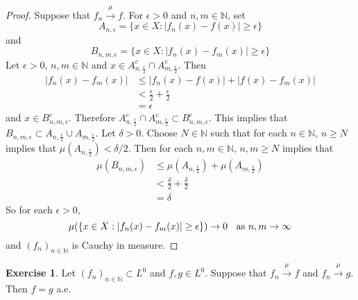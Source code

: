 \documentclass[12pt]{amsart}
\theoremstyle{definition}
\newtheorem{ex}[definition]{Exercise}
\newcommand{\del}{\delta}
\newcommand{\ep}{\epsilon}
\newcommand{\N}{\mathbb{N}}
\newcommand{\conv}[1]{\xrightarrow{#1}}
\begin{document}
	\begin{proof}
	Suppose that $f_n \conv{\mu} f$. For $\ep >0$ and $n,m \in \N$, set 
	$$A_{n, \ep} = \{x \in X: |f_n(x) - f(x)| \geq \ep \}$$ 
	and 
	$$B_{n,m, \ep} = \{x \in X: |f_n(x) - f_m(x)| \geq \ep \}$$
	Let $\ep >0$, $n, m \in \N$ and $x \in A_{n, \frac{\ep}{2}}^c \cap A_{m, \frac{\ep}{2}}^c$. Then 
	\begin{align*}
	|f_n(x) - f_m(x)| 
	& \leq  |f_n(x) - f(x)| + |f(x) - f_m(x)| \\
	& < \frac{\ep}{2} + \frac{\ep}{2} \\
	&= \ep  
	\end{align*}
	and $x \in B_{n,m, \ep}^c$. Therefore $A_{n, \frac{\ep}{2}}^c \cap A_{m, \frac{\ep}{2}}^c \subset B_{n,m, \ep}^c$. This implies that $B_{n,m, \ep} \subset A_{n, \frac{\ep}{2}} \cup A_{m, \frac{\ep}{2}}$. Let $\del >0$. Choose $N \in \N$ such that for each $n \in \N$, $n \geq N$ implies that $\mu(A_{n, \frac{\ep}{2}}) < \del/2$. Then for each $n,m \in \N$, $n, m \geq N$ implies that 
	\begin{align*}
	\mu(B_{n,m, \ep}) 
	&\leq \mu(A_{n, \frac{\ep}{2}}) + \mu(A_{m, \frac{\ep}{2}}) \\
	& < \frac{\del}{2} + \frac{\del}{2} \\
	&= \del
	\end{align*}
	So for each $\ep >0$, $$\mu(\{x \in X: |f_n(x) - f_m(x)| \geq \ep \}) \rightarrow 0 \hspace{.2cm }\text{ as } n,m \rightarrow \infty$$  
	and $(f_n)_{n \in \N}$ is Cauchy in measure.
	\end{proof}
	
	\begin{ex}
	Let $(f_n)_{n \in \N} \subset L^0$ and $f, g \in L^0$. Suppose that $f_n \conv{\mu} f$ and $f_n \conv{\mu} g$. Then $f = g$ a.e. 
	\end{ex}
	
\end{document}
